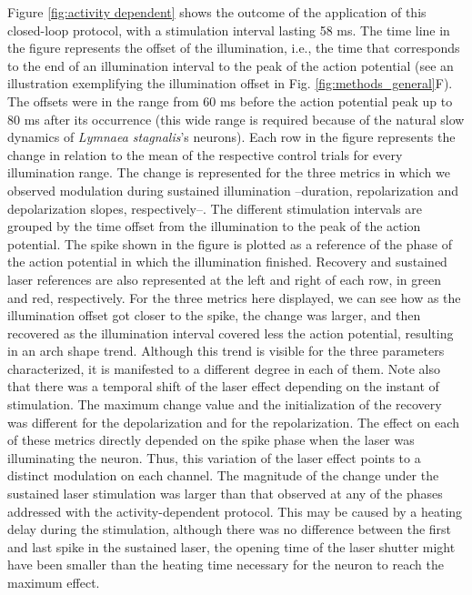 Figure \ref{fig:activity dependent} shows the outcome of the application of this closed-loop protocol, with a stimulation interval lasting 58 ms. The time line in the figure represents the offset of the illumination, i.e., the time that corresponds to the end of an illumination interval to the peak of the action potential (see an illustration exemplifying the illumination offset in Fig. \ref{fig:methods_general}F). The offsets were in the range from 60 ms before the action potential peak up to 80 ms after its occurrence (this wide range is required because of the natural slow dynamics of \textit{Lymnaea stagnalis}'s neurons). Each row in the figure represents the change in relation to the mean of the respective control trials for every illumination range. The change is represented for the three metrics in which we observed modulation during sustained illumination --duration, repolarization and depolarization slopes, respectively--. The different stimulation intervals are grouped by the time offset from the illumination to the peak of the action potential. The spike shown in the figure is plotted as a reference of the phase of the action potential in which the illumination finished. Recovery and sustained laser references are also represented at the left and right of each row, in green and red, respectively. For the three metrics here displayed, we can see how as the illumination offset got closer to the spike, the change was larger, and then recovered as the illumination interval covered less the action potential, resulting in an arch shape trend. Although this trend is visible for the three parameters characterized, it is manifested to a different degree in each of them. Note also that there was a temporal shift of the laser effect depending on the instant of stimulation. The maximum change value and the initialization of the recovery was different for the depolarization and for the repolarization. The effect on each of these metrics directly depended on the spike phase when the laser was illuminating the neuron. Thus, this variation of the laser effect points to a distinct modulation on each channel. The magnitude of the change under the sustained laser stimulation was larger than that observed at any of the phases addressed with the activity-dependent protocol. This may be caused by a heating delay during the stimulation, although there was no difference between the first and last spike in the sustained laser, the opening time of the laser shutter might have been smaller than the heating time necessary for the neuron to reach the maximum effect.

